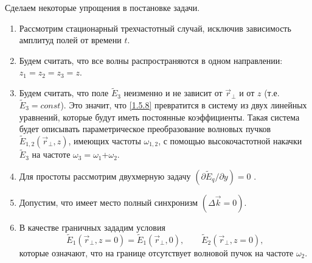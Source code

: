 \documentclass[a4paper]{article}
\begin{document}
Сделаем некоторые упрощения в постановке задачи.
\begin{enumerate}
	\item Рассмотрим стационарный трехчастотный случай, исключив зависимость амплитуд полей от времени  $t$.
	\item Будем считать, что все волны распространяются в одном направлении: $z_{1}=z_{2}=z_{3}=z$.
	\item Будем считать, что поле $\tilde{E}_{3}$  неизменно и не зависит от $\vec{r}_{\perp}$  и от $z$  (т.е. $\tilde{E}_{3} = const$). Это значит, что \eqref{1.5.8} превратится в систему из двух линейных уравнений, которые будут иметь постоянные коэффициенты. Такая система будет описывать параметрическое преобразование волновых пучков $\tilde{E}_{1,2}\left(\vec{r}_{\perp},z\right)$, имеющих частоты $\omega_{1,2}$, с помощью высокочастотной накачки $\tilde{E}_{3}$  на частоте  $\omega_{3}=\omega_{1}$+$\omega_{2}$.
	\item  Для простоты рассмотрим двухмерную задачу $\left(\partial\tilde{E}_{q}/\partial y\right)=0$ .
	\item Допустим, что имеет место полный синхронизм $(\Delta\vec{k}=0)$. 
	\item В качестве граничных зададим  условия
	\begin{equation}
		\tilde{E}_{1}\left(\vec{r}_{\perp},z=0\right)=\tilde{E}_{1}\left(\vec{r}_{\perp},0\right),\qquad\tilde{E}_{2}\left(\vec{r}_{\perp},z=0\right),
		\label{1.5.9}
	\end{equation}
	которые означают, что на границе отсутствует волновой пучок на частоте $\omega_{2}$.
	

\end{enumerate}
\end{document}
